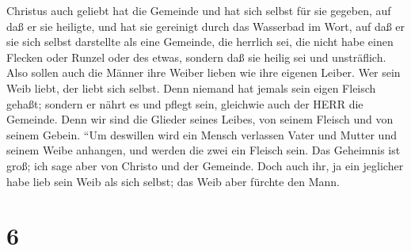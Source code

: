 Christus auch geliebt hat die Gemeinde und hat sich selbst für sie
gegeben,  auf daß er sie heiligte, und hat sie gereinigt
durch das Wasserbad im Wort,  auf daß er sie sich selbst
darstellte als eine Gemeinde, die herrlich sei, die nicht habe einen
Flecken oder Runzel oder des etwas, sondern daß sie heilig sei und
unsträflich.  Also sollen auch die Männer ihre Weiber
lieben wie ihre eigenen Leiber. Wer sein Weib liebt, der liebt sich
selbst.  Denn niemand hat jemals sein eigen Fleisch gehaßt;
sondern er nährt es und pflegt sein, gleichwie auch der HERR die
Gemeinde.  Denn wir sind die Glieder seines Leibes, von
seinem Fleisch und von seinem Gebein.  ``Um deswillen wird
ein Mensch verlassen Vater und Mutter und seinem Weibe anhangen, und
werden die zwei ein Fleisch sein.  Das Geheimnis ist groß;
ich sage aber von Christo und der Gemeinde.  Doch auch ihr,
ja ein jeglicher habe lieb sein Weib als sich selbst; das Weib aber
fürchte den Mann.

\hypertarget{section-5}{%
\section{6}\label{section-5}}

